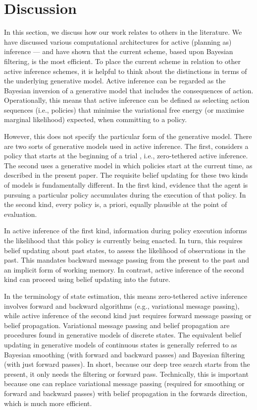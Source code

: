 \documentclass[twoside,11pt]{article}
\begin{document}
\section{Discussion} \label{sec:discussion}

In this section, we discuss how our work relates to others in the literature. We have discussed various computational architectures for active (planning as) inference --- and have shown that the current scheme, based upon Bayesian filtering, is the most efficient. To place the current scheme in relation to other active inference schemes, it is helpful to think about the distinctions in terms of the underlying generative model. Active inference can be regarded as the Bayesian inversion of a generative model that includes the consequences of action. Operationally, this means that active inference can be defined as selecting action sequences (i.e., policies) that minimise the variational free energy (or maximise marginal likelihood) expected, when committing to a policy.

However, this does not specify the particular form of the generative model. There are two sorts of generative models used in active inference. The first, considers a policy that starts at the beginning of a trial \citep{believe}, i.e., zero-tethered active inference. The second uses a generative model in which policies start at the current time, as described in the present paper. The requisite belief updating for these two kinds of models is fundamentally different. In the first kind, evidence that the agent is pursuing a particular policy accumulates during the execution of that policy. In the second kind, every policy is, a priori, equally plausible at the point of evaluation.

In active inference of the first kind, information during policy execution informs the likelihood that this policy is currently being enacted. In turn, this requires belief updating about past states, to assess the likelihood of observations in the past. This mandates backward message passing from the present to the past and an implicit form of working memory. In contrast, active inference of the second kind can proceed using belief updating into the future.

In the terminology of state estimation, this means zero-tethered active inference involves forward and backward algorithms (e.g., variational message passing), while active inference of the second kind just requires forward message passing or belief propagation. Variational message passing and belief propagation are procedures found in generative models of discrete states. The equivalent belief updating in generative models of continuous states is generally referred to as Bayesian smoothing (with forward and backward passes) and Bayesian filtering (with just forward passes). In short, because our deep tree search starts from the present, it only needs the filtering or forward pass. Technically, this is important because one can replace variational message passing (required for smoothing or forward and backward passes) with belief propagation in the forwards direction, which is much more efficient.
\end{document}
